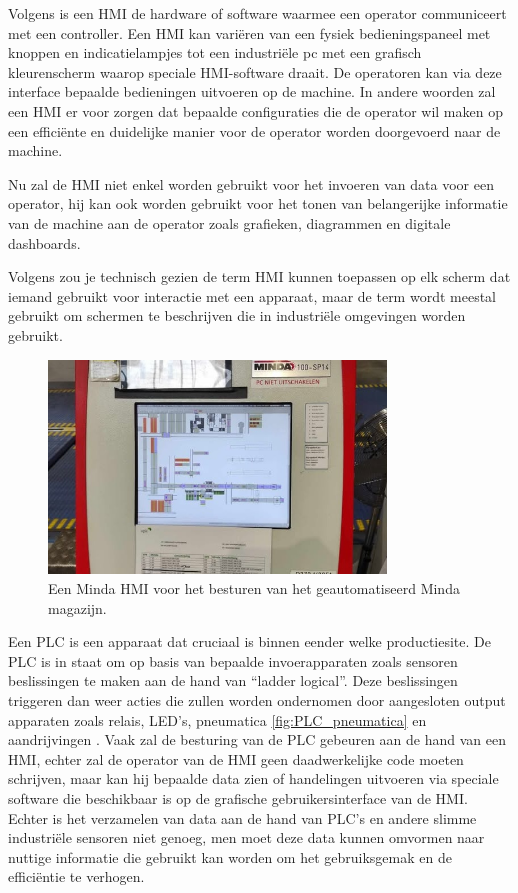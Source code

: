 \vspace{5mm} 
Volgens \textcite{Nist2025} is een HMI de hardware of software waarmee een operator communiceert met een controller. Een HMI kan variëren van een fysiek bedieningspaneel met knoppen en indicatielampjes tot een industriële pc met een grafisch kleurenscherm waarop speciale HMI-software draait. De operatoren kan via deze interface bepaalde bedieningen uitvoeren op de machine. In andere woorden zal een HMI er voor zorgen dat bepaalde configuraties die de operator wil maken op een efficiënte en duidelijke manier voor de operator worden doorgevoerd naar de machine. 

\vspace{5mm}
Nu zal de HMI niet enkel worden gebruikt voor het invoeren van data voor een operator, hij kan ook worden gebruikt voor het tonen van belangerijke informatie van de machine aan de operator zoals grafieken, diagrammen en digitale dashboards. \autocite{Inductive2025}

\vspace{5mm}
Volgens \textcite{Copadata2025} zou je technisch gezien de term HMI kunnen toepassen op elk scherm dat iemand gebruikt voor interactie met een apparaat, maar de term wordt meestal gebruikt om schermen te beschrijven die in industriële omgevingen worden gebruikt.

\begin{figure}[H]
    \centering
    \includegraphics[width=0.8\textwidth]{fotos/Minda_HMI.jpg}
    \caption[Minda HMI]{\label{fig:MindaHMI}Een Minda HMI voor het besturen van het geautomatiseerd Minda magazijn.}
\end{figure} 

Een PLC is een apparaat dat cruciaal is binnen eender welke productiesite. De PLC is in staat om op basis van bepaalde invoerapparaten zoals sensoren beslissingen te maken aan de hand van “ladder logical”. Deze beslissingen triggeren dan weer acties die zullen worden ondernomen door aangesloten output apparaten zoals relais, LED’s, pneumatica \ref{fig:PLC_pneumatica} en aandrijvingen \autocite{unitronics2025}.
Vaak zal de besturing van de PLC gebeuren aan de hand van een HMI, echter zal de operator van de HMI geen daadwerkelijke code moeten schrijven, maar kan hij bepaalde data zien of handelingen uitvoeren via speciale software die beschikbaar is op de grafische gebruikersinterface van de HMI. Echter is het verzamelen van data aan de hand van PLC’s en andere slimme industriële sensoren niet genoeg, men moet deze data kunnen omvormen naar nuttige informatie die gebruikt kan worden om het gebruiksgemak en de efficiëntie te verhogen. 

